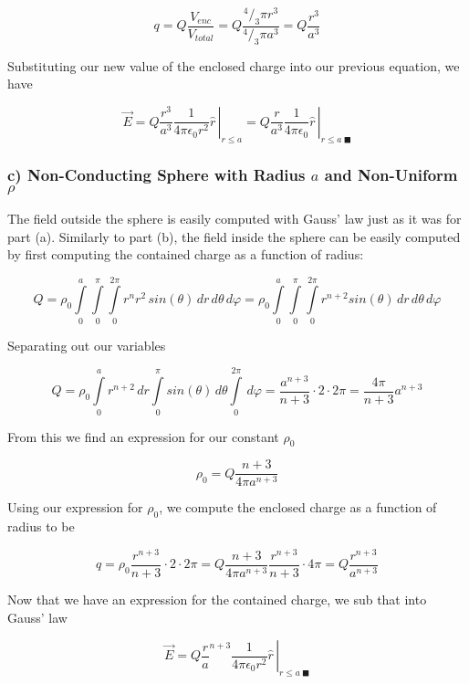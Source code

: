 \begin{equation}
  q
  = Q \frac{V_{enc}}{V_{total}}
  = Q \frac{^4/_3 \pi r^3}{^4/_3 \pi a^3}
  = Q \frac{r^3}{a^3}
\end{equation}

Substituting our new value of the enclosed charge into our previous
equation, we have

\begin{equation}
  \vec{E} = \left. Q \frac{r^3}{a^3}\frac{1}{4 \pi \epsilon_0 r^2} \hat{r}\, \right|_{r \leq a}
  = \left. Q \frac{r}{a^3}\frac{1}{4 \pi \epsilon_0} \hat{r}\, \right|_{r \leq a\ \blacksquare}
\end{equation}


\subsubsection*{c) Non-Conducting Sphere with Radius $a$ and Non-Uniform $\rho$}

The field outside the sphere is easily computed with Gauss' law just
as it was for part (a).  Similarly to part (b), the field inside the
sphere can be easily computed by first computing the contained charge
as a function of radius:

\begin{equation}
  Q
  = \rho_0
  \int\limits_0^a
  \int\limits_0^\pi
  \int\limits_0^{2\pi}
  r^n
  r^2\,sin(\theta)
  \,dr
  \,d\theta
  \,d\varphi
  = \rho_0
  \int\limits_0^a
  \int\limits_0^\pi
  \int\limits_0^{2\pi}
  r^{n+2}
  sin(\theta)
  \,dr
  \,d\theta
  \,d\varphi
\end{equation}

Separating out our variables

\begin{equation}
  Q
  = \rho_0
  \int\limits_0^a
  r^{n+2}
  \,dr
  \int\limits_0^\pi
  sin(\theta)
  \,d\theta
  \int\limits_0^{2\pi}
  \,d\varphi
  = \frac{a^{n+3}}{n+3} \cdot 2 \cdot 2\pi
  = \frac{4\pi}{n+3} a^{n+3}
\end{equation}

From this we find an expression for our constant $\rho_0$

\begin{equation}
  \rho_0 = Q \frac{n+3}{4\pi a^{n+3}}
\end{equation}

Using our expression for $\rho_0$, we compute the enclosed charge as a
function of radius to be

\begin{equation}
  q
  = \rho_0 \frac{r^{n+3}}{n+3} \cdot 2 \cdot 2\pi
  = Q \frac{n+3}{4\pi a^{n+3}} \frac{r^{n+3}}{n+3} \cdot 4\pi
  = Q \frac{r^{n+3}}{a^{n+3}}
\end{equation}

Now that we have an expression for the contained charge, we sub that
into Gauss' law

\begin{equation}
  \vec{E}
  = \left. Q \frac{r}{a}^{n+3} \frac{1}{4 \pi \epsilon_0 r^2} \hat{r}\, \right|_{r \leq a\ \blacksquare}
\end{equation}
